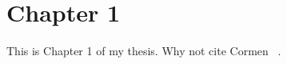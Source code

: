 \chapter{Chapter 1}
\label{chap:ch1}

This is Chapter 1 of my thesis. Why not cite Cormen \etal~\cite{Cormen:book:2009}.
